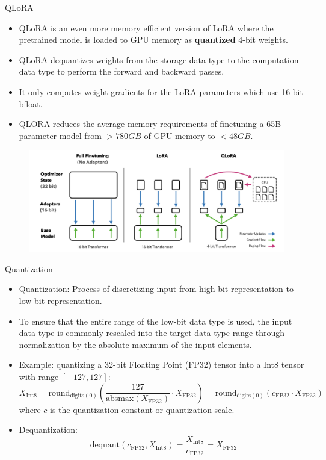 \documentclass[handout]{beamer}
\begin{document}
\begin{frame}{QLoRA}
\begin{scriptsize}
\begin{itemize}
\item QLoRA is an even more memory efficient version of LoRA where the pretrained model is loaded to GPU memory as \textbf{quantized} 4-bit weights.
\item QLoRA dequantizes weights from the storage data type to the computation data type to perform the forward and backward passes.
\item It only computes weight gradients for the LoRA parameters which use 16-bit bfloat.
\item QLORA reduces the average memory requirements of finetuning a 65B parameter model from $>780GB$ of GPU memory to $<48GB$.
\end{itemize}
\end{scriptsize}
     \begin{figure}[h]
	\includegraphics[scale = 0.22]{pics/qlora.png}
\end{figure}

\end{frame}

\begin{frame}{Quantization}
\scriptsize
    \begin{itemize}
        \item Quantization: Process of discretizing input from high-bit representation to low-bit representation.
      \item To ensure that the entire range of the low-bit data type is used, the input data type is commonly rescaled into the target data type range through normalization by the absolute maximum of the input elements.
        \item Example: quantizing a 32-bit Floating Point (FP32) tensor into a Int8 tensor with range $[-127, 127]$:
        \[X_{\text{Int8}} = \text{round}_{\text{digits}(0)}\left(\frac{127}{\text{absmax}(X_{\text{FP32}})} \cdot X_{\text{FP32}}\right) = \text{round}_{\text{digits}(0)}\left(c_{\text{FP32}} \cdot X_{\text{FP32}}\right)\]
        where $c$ is the quantization constant or quantization scale.
        \item Dequantization:
    \[\text{dequant}(c_{\text{FP32}}, X_{\text{Int8}}) = \frac{X_{\text{Int8}}}{ c_{\text{FP32}}} = X_{\text{FP32}}\]
    \end{itemize}
\end{frame}
\end{document}
